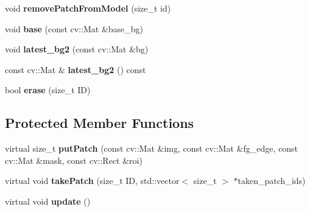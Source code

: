 \begin{DoxyCompactItemize}
void {\bfseries remove\+Patch\+From\+Model} (size\+\_\+t id)
\item 
\hypertarget{classskl_1_1_patch_model_bi_background_a062a4ddd81d43392be272dabffd891b5}{}\label{classskl_1_1_patch_model_bi_background_a062a4ddd81d43392be272dabffd891b5} 
void {\bfseries base} (const cv\+::\+Mat \&base\+\_\+bg)
\item 
\hypertarget{classskl_1_1_patch_model_bi_background_a7076aea8f4cdbf1b841b01e07734e9f6}{}\label{classskl_1_1_patch_model_bi_background_a7076aea8f4cdbf1b841b01e07734e9f6} 
void {\bfseries latest\+\_\+bg2} (const cv\+::\+Mat \&bg)
\item 
\hypertarget{classskl_1_1_patch_model_bi_background_a003aba462dc25be800fd6a610015bbf2}{}\label{classskl_1_1_patch_model_bi_background_a003aba462dc25be800fd6a610015bbf2} 
const cv\+::\+Mat \& {\bfseries latest\+\_\+bg2} () const
\item 
\hypertarget{classskl_1_1_patch_model_bi_background_a5d1804b0aa78e775b67ca9df8c0b64a0}{}\label{classskl_1_1_patch_model_bi_background_a5d1804b0aa78e775b67ca9df8c0b64a0} 
bool {\bfseries erase} (size\+\_\+t ID)
\end{DoxyCompactItemize}
\subsection*{Protected Member Functions}
\begin{DoxyCompactItemize}
\item 
\hypertarget{classskl_1_1_patch_model_bi_background_a8cc32d4d6f0ccd12f51c2eb43f56f615}{}\label{classskl_1_1_patch_model_bi_background_a8cc32d4d6f0ccd12f51c2eb43f56f615} 
virtual size\+\_\+t {\bfseries put\+Patch} (const cv\+::\+Mat \&img, const cv\+::\+Mat \&fg\+\_\+edge, const cv\+::\+Mat \&mask, const cv\+::\+Rect \&roi)
\item 
\hypertarget{classskl_1_1_patch_model_bi_background_ad1aefd40d2fb6f7ccd540f9cbd512118}{}\label{classskl_1_1_patch_model_bi_background_ad1aefd40d2fb6f7ccd540f9cbd512118} 
virtual void {\bfseries take\+Patch} (size\+\_\+t ID, std\+::vector$<$ size\+\_\+t $>$ $\ast$taken\+\_\+patch\+\_\+ids)
\item 
\hypertarget{classskl_1_1_patch_model_bi_background_ac491c5b0cd10591ee0ac7a2e4a3108ea}{}\label{classskl_1_1_patch_model_bi_background_ac491c5b0cd10591ee0ac7a2e4a3108ea} 
virtual void {\bfseries update} ()
\end{DoxyCompactItemize}
